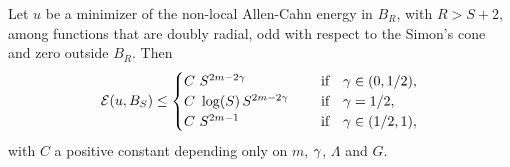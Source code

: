 \begin{theorem}
\label{Th:EnergyEstimate}
Let $u$ be a minimizer of the non-local Allen-Cahn energy in $B_{R}$, with $R>S+2$, among functions that are doubly radial, odd with respect to the Simon's cone and zero outside $B_R$. Then
$$ \mathcal{E} (u,B_S) \leq \begin{cases}
C \ S^{2m-2\gamma}\ \ \ \ &\textrm{if } \ \ \gamma\in(0,1/2),\\
C\ \log(S)\,S^{2m-2\gamma}\ \ \ \ &\textrm{if } \ \ \gamma=1/2,\\
C \ S^{2m-1}\ \ \ \ &\textrm{if } \ \ \gamma\in(1/2,1),\\
\end{cases} $$
with $C$ a positive constant depending only on $m$, $\gamma$, $\Lambda$ and $G$.
\end{theorem}

